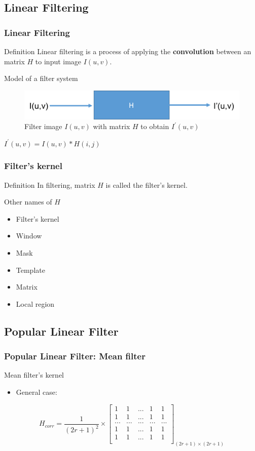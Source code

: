 \documentclass[english,11pt,table,handout]{beamer}
\begin{document}
\subsection{Linear Filtering}
\frame
{
	\frametitle{Linear Filtering}
	\begin{block}{Definition}
		Linear filtering is a process of applying the \alert{\textbf{convolution}} between an matrix $H$ to input image $I(u,v)$.
	\end{block}
	\begin{block}{Model of a filter system}
		\begin{figure}[!h]
			\includegraphics[scale=0.57]{filtersys.png}
			\caption{Filter image $I(u,v)$ with matrix $H$ to obtain $I^{'}(u,v)$} 
		\end{figure}
		
		\centering
		$I^{'}(u,v) =  I(u,v)*H(i,j)$
	\end{block}
}
\frame
{
	\frametitle{Filter's kernel}
	\begin{block}{Definition}
		In filtering, matrix $H$ is called the filter's kernel.
	\end{block}
	\begin{block}{Other names of $H$}
		\begin{itemize}
			\item Filter's kernel
			\item Window
			\item Mask
			\item Template
			\item Matrix
			\item Local region
		\end{itemize}
	\end{block}
}
\subsection{Popular Linear Filter}
\frame
{
	\frametitle{Popular Linear Filter: Mean filter}
	\begin{example}
		Mean filter's kernel
		\begin{itemize}
			\item General case:
		\end{itemize}
		$$
		H_{corr} = \frac{1}{(2r+1)^2} \times 
		\begin{bmatrix}
		1 & 1 & ... & 1 & 1 \\
		1 & 1 & ... & 1 & 1 \\
		... & ... & ... & ... & ... \\
		1 & 1 & ... & 1 & 1 \\
		1 & 1 & ... & 1 & 1 \\
		\end{bmatrix}_{(2r+1) \times (2r+1)}
		$$
	\end{example}
}
\end{document}
